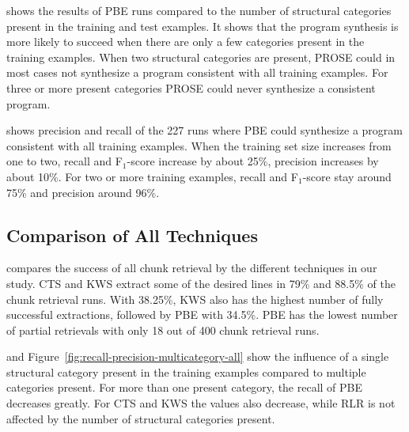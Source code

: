  shows the results of PBE runs compared to the number of structural categories present in the training and test examples.
It shows that the program synthesis is more likely to succeed when there are only a few categories present in the training examples.
When two structural categories are present, PROSE could in most cases not synthesize a program consistent with all training examples.
For three or more present categories PROSE could never synthesize a consistent program.

 shows precision and recall of the 227 runs where PBE could synthesize a program consistent with all training examples.
When the training set size increases from one to two, recall and F$_{1}$-score increase by about 25\%, precision increases by about 10\%.
For two or more training examples, recall and F$_{1}$-score stay around 75\% and precision around 96\%.


\subsection{Comparison of All Techniques}
 compares the success of all chunk retrieval by the different techniques in our study.
CTS and KWS extract some of the desired lines in 79\% and 88.5\% of the chunk retrieval runs.
With 38.25\%, KWS also has the highest number of fully successful extractions, followed by PBE with 34.5\%.
PBE has the lowest number of partial retrievals with only 18 out of 400 chunk retrieval runs.


 and Figure~\ref{fig:recall-precision-multicategory-all} show the influence of a single structural category present in the training examples compared to multiple categories present.
For more than one present category, the recall of PBE decreases greatly.
For CTS and KWS the values also decrease, while RLR is not affected by the number of structural categories present.

